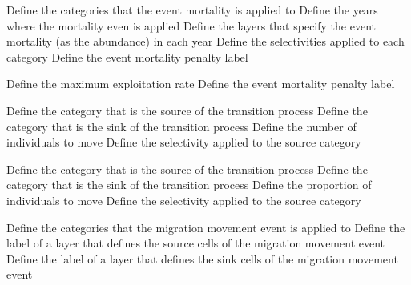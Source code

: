 \par\textbf{}\par
{} {Define the categories that the event mortality is applied to}
 {Define the years where the mortality even is applied}
 {Define the layers that specify the event mortality (as the abundance) in each year}
 {Define the selectivities applied to each category}
 {Define the event mortality penalty label}
\par\textbf{}\par
{}
 {Define the maximum exploitation rate}
 {Define the event mortality penalty label}
\par\textbf{}\par
{} {Define the category that is the source of the transition process}
 {Define the category that is the sink of the transition process}
 {Define the number of individuals to move}
 {Define the selectivity applied to the source category}
\par\textbf{}\par
{} {Define the category that is the source of the transition process}
 {Define the category that is the sink of the transition process}
 {Define the proportion of individuals to move}
 {Define the selectivity applied to the source category}
\par\textbf{}\par
{} {Define the categories that the migration movement event is applied to}
 {Define the label of a layer that defines the source cells of the migration movement event}
 {Define the label of a layer that defines the sink cells of the migration movement event}
